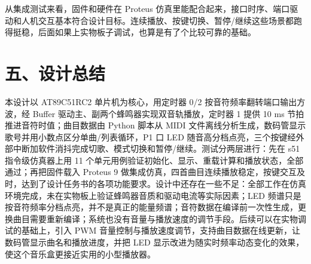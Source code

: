\documentclass[zihao=-4,a4paper]{ctexart}
\begin{document}
从集成测试来看，固件和硬件在 Proteus 仿真里能配合起来，接口时序、端口驱动和人机交互基本符合设计目标。连续播放、按键切换、暂停/继续这些场景都跑得挺稳，后面如果上实物板子调试，也算是有了个比较可靠的基础。

\section*{五、设计总结}

本设计以 AT89C51RC2 单片机为核心，用定时器 0/2 按音符频率翻转端口输出方波，经 Buffer 驱动主、副两个蜂鸣器实现双音轨播放，定时器 1 提供 10 ms 节拍推进音符时值；曲目数据由 Python 脚本从 MIDI 文件离线分析生成，数码管显示歌号并用小数点区分单曲/列表循环，P1 口 LED 随音高分档点亮，三个按键经外部中断加软件消抖完成切歌、模式切换和暂停/继续。测试分两层进行：先在 s51 指令级仿真器上用 11 个单元用例验证初始化、显示、重载计算和播放状态，全部通过；再把固件载入 Proteus 9 做集成仿真，四首曲目连续播放稳定，按键交互及时，达到了设计任务书的各项功能要求。设计中还存在一些不足：全部工作在仿真环境完成，未在实物板上验证蜂鸣器音质和驱动电流等实际因素；LED 频谱只是按音符频率分档点亮，并不是真正的能量频谱；音符数据在编译前一次性生成，更换曲目需要重新编译；系统也没有音量与播放速度的调节手段。后续可以在实物调试的基础上，引入 PWM 音量控制与播放速度调节，支持曲目数据在线更新，让数码管显示曲名和播放进度，并把 LED 显示改进为随实时频率动态变化的效果，使这个音乐盒更接近实用的小型播放器。
\end{document}
